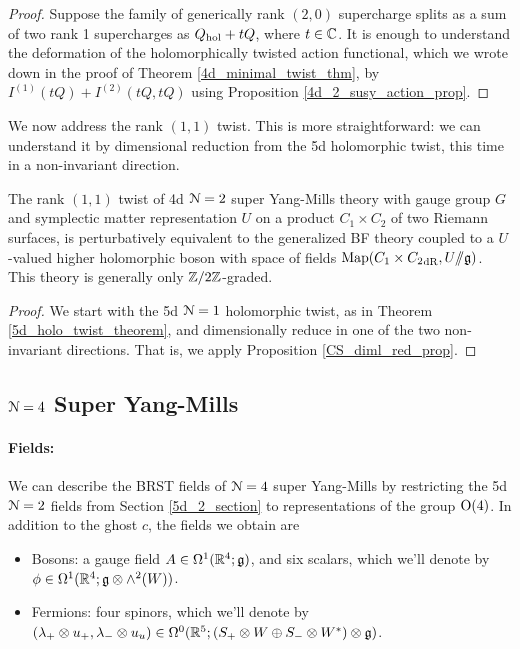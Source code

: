 \documentclass[10pt, oneside]{article}
\newcommand{\ham}{/\!\!/}
\begin{document}
\begin{proof}
Suppose the family of generically rank $(2,0)$ supercharge splits as a sum of two rank 1 supercharges as $Q_{\mathrm{hol}} + tQ$, where $t \in \mathbb C$.  It is enough to understand the deformation of the holomorphically twisted action functional, which we wrote down in the proof of Theorem \ref{4d_minimal_twist_thm}, by $I^{(1)}(tQ) + I^{(2)}(tQ,tQ)$ using Proposition \ref{4d_2_susy_action_prop}.

\end{proof}

We now address the rank $(1,1)$ twist.  This is more straightforward: we can understand it by dimensional reduction from the 5d holomorphic twist, this time in a non-invariant direction.

\begin{theorem} \label{4d_11_twist_thm}
The rank $(1,1)$ twist of 4d $\mathcal{N}=2$ super Yang-Mills theory with gauge group $G$ and symplectic matter representation $U$ on a product $C_1 \times C_2$ of two Riemann surfaces, is perturbatively equivalent to the generalized BF theory coupled to a $U$-valued higher holomorphic boson with space of fields $\mr{Map}(C_1 \times {C_2}_{\mr{dR}}, U\ham \gg)$.  This theory is generally only $\mathbb Z/2\mathbb Z$-graded.
\end{theorem}

\begin{proof}
We start with the 5d $\mathcal{N}=1$ holomorphic twist, as in Theorem \ref{5d_holo_twist_theorem}, and dimensionally reduce in one of the two non-invariant directions.  That is, we apply Proposition \ref{CS_diml_red_prop}.
\end{proof}



\subsection{\texorpdfstring{$\mathcal N=4$}{N=4} Super Yang-Mills} \label{4d_4_section}

\vspace{-10pt}
\paragraph{Fields:} We can describe the BRST fields of $\mathcal{N}=4$ super Yang-Mills by restricting the 5d $\mathcal{N}=2$ fields from Section \ref{5d_2_section} to representations of the group $\mathrm{O}(4)$.  In addition to the ghost $c$, the fields we obtain are
\begin{itemize}
 \item Bosons: a gauge field $A \in \Omega^1(\mathbb R^4; \mathfrak{g})$, and six scalars, which we'll denote by $\phi \in \Omega^1(\mathbb R^4; \mathfrak{g} \otimes \wedge^2(W))$.
 \item Fermions: four spinors, which we'll denote by $(\lambda_+ \otimes u_+, \lambda_- \otimes u_u) \in \Omega^0(\mathbb R^5; (S_+ \otimes W \oplus S_- \otimes W^*) \otimes \mathfrak{g})$.
\end{itemize}
\end{document}
